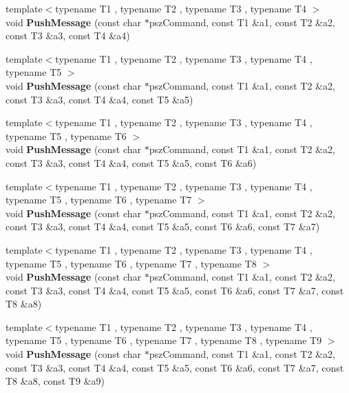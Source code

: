 \begin{DoxyCompactItemize}
\item 
\mbox{\label{class_c_node_a2958ee10e2c96ef647787bce80196079}} 
{\footnotesize template$<$typename T1 , typename T2 , typename T3 , typename T4 $>$ }\\void {\bfseries Push\+Message} (const char $\ast$psz\+Command, const T1 \&a1, const T2 \&a2, const T3 \&a3, const T4 \&a4)
\item 
\mbox{\label{class_c_node_a1f58deeed29baf57c49dae177f8be826}} 
{\footnotesize template$<$typename T1 , typename T2 , typename T3 , typename T4 , typename T5 $>$ }\\void {\bfseries Push\+Message} (const char $\ast$psz\+Command, const T1 \&a1, const T2 \&a2, const T3 \&a3, const T4 \&a4, const T5 \&a5)
\item 
\mbox{\label{class_c_node_a4addbff355c502fb2f8c10451e76373d}} 
{\footnotesize template$<$typename T1 , typename T2 , typename T3 , typename T4 , typename T5 , typename T6 $>$ }\\void {\bfseries Push\+Message} (const char $\ast$psz\+Command, const T1 \&a1, const T2 \&a2, const T3 \&a3, const T4 \&a4, const T5 \&a5, const T6 \&a6)
\item 
\mbox{\label{class_c_node_ab3611cdb08d5f25a4da05fe140e48625}} 
{\footnotesize template$<$typename T1 , typename T2 , typename T3 , typename T4 , typename T5 , typename T6 , typename T7 $>$ }\\void {\bfseries Push\+Message} (const char $\ast$psz\+Command, const T1 \&a1, const T2 \&a2, const T3 \&a3, const T4 \&a4, const T5 \&a5, const T6 \&a6, const T7 \&a7)
\item 
\mbox{\label{class_c_node_af91d09012aa7e879be4b488b0bba903d}} 
{\footnotesize template$<$typename T1 , typename T2 , typename T3 , typename T4 , typename T5 , typename T6 , typename T7 , typename T8 $>$ }\\void {\bfseries Push\+Message} (const char $\ast$psz\+Command, const T1 \&a1, const T2 \&a2, const T3 \&a3, const T4 \&a4, const T5 \&a5, const T6 \&a6, const T7 \&a7, const T8 \&a8)
\item 
\mbox{\label{class_c_node_a1af04d8219e8e6aafe5b6446000cd9ff}} 
{\footnotesize template$<$typename T1 , typename T2 , typename T3 , typename T4 , typename T5 , typename T6 , typename T7 , typename T8 , typename T9 $>$ }\\void {\bfseries Push\+Message} (const char $\ast$psz\+Command, const T1 \&a1, const T2 \&a2, const T3 \&a3, const T4 \&a4, const T5 \&a5, const T6 \&a6, const T7 \&a7, const T8 \&a8, const T9 \&a9)

\end{DoxyCompactItemize}
